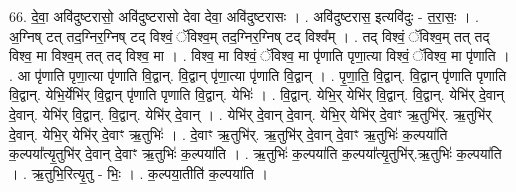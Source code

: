 \documentclass[17pt]{extarticle}
\begin{document}
66. दे॒वा॒ अवि॑दुष्टरासो॒ अवि॑दुष्टरासो देवा देवा॒ अवि॑दुष्टरासः । . अवि॑दुष्टरास॒ इत्यवि॑दुः - त॒रा॒सः॒ । . अ॒ग्निष् टत् तद॒ग्निर॒ग्निष् टद् विश्वं॒ ॅविश्व॒म् तद॒ग्निर॒ग्निष् टद् विश्व᳚म् । . तद् विश्वं॒ ॅविश्व॒म् तत् तद् विश्व॒ मा विश्व॒म् तत् तद् विश्व॒ मा । . विश्व॒ मा विश्वं॒ ॅविश्व॒ मा पृ॑णाति पृणा॒त्या विश्वं॒ ॅविश्व॒ मा पृ॑णाति । . आ पृ॑णाति पृणा॒त्या पृ॑णाति वि॒द्वान्. वि॒द्वान् पृ॑णा॒त्या पृ॑णाति वि॒द्वान् । . पृ॒णा॒ति॒ वि॒द्वान्. वि॒द्वान् पृ॑णाति पृणाति वि॒द्वान्. येभि॒र्येभि॑र् वि॒द्वान् पृ॑णाति पृणाति वि॒द्वान्. येभिः॑ । . वि॒द्वान्. येभि॒र् येभि॑र् वि॒द्वान्. वि॒द्वान्. येभि॑र् दे॒वान् दे॒वान्. येभि॑र् वि॒द्वान्. वि॒द्वान्. येभि॑र् दे॒वान् । . येभि॑र् दे॒वान् दे॒वान्. येभि॒र् येभि॑र् दे॒वाꣳ ऋ॒तुभि॑र्. ऋ॒तुभि॑र् दे॒वान्. येभि॒र् येभि॑र् दे॒वाꣳ ऋ॒तुभिः॑ । . दे॒वाꣳ ऋ॒तुभि॑र्. ऋ॒तुभि॑र् दे॒वान् दे॒वाꣳ ऋ॒तुभिः॑ क॒ल्पया॑ति क॒ल्पया᳚त्यृ॒तुभि॑र् दे॒वान् दे॒वाꣳ ऋ॒तुभिः॑ क॒ल्पया॑ति । . ऋ॒तुभिः॑ क॒ल्पया॑ति क॒ल्पया᳚त्यृ॒तुभि॑र्.ऋ॒तुभिः॑ क॒ल्पया॑ति । . ऋ॒तुभि॒रित्यृ॒तु - भिः॒ । . क॒ल्पया॒तीति॑ क॒ल्पया॑ति । \newline
\pagebreak
\end{document}
